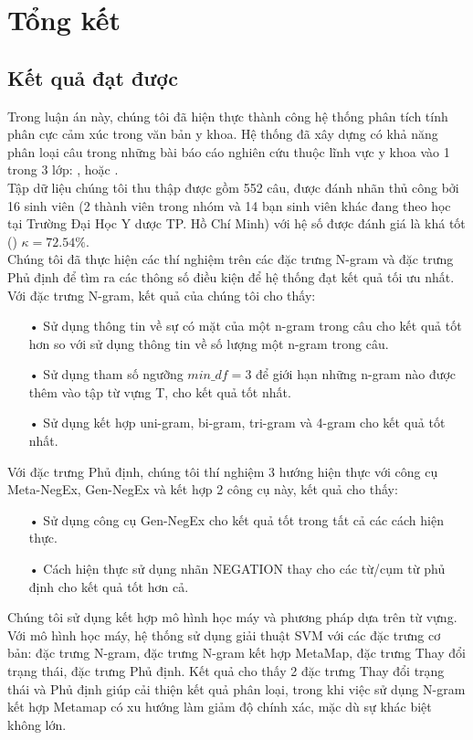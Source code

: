 \section{Tổng kết}
\subsection{Kết quả đạt được}
Trong luận án này, chúng tôi đã hiện thực thành công hệ thống phân tích tính phân cực cảm xúc trong văn bản y khoa. Hệ thống đã xây dựng có khả năng phân loại câu trong những bài báo cáo nghiên cứu thuộc lĩnh vực y khoa vào 1 trong 3 lớp: \tichcuc, \tieucuc hoặc \trungtinh. \\

Tập dữ liệu chúng tôi thu thập được gồm 552 câu, được đánh nhãn thủ công bởi 16 sinh viên (2 thành viên trong nhóm và 14 bạn sinh viên khác đang theo học tại Trường Đại Học Y dược TP. Hồ Chí Minh) với hệ số  được đánh giá là khá tốt () $\kappa=72.54\%$.\\

Chúng tôi đã thực hiện các thí nghiệm trên các đặc trưng N-gram và đặc trưng Phủ định để tìm ra các thông số điều kiện để hệ thống đạt kết quả tối ưu nhất. Với đặc trưng N-gram, kết quả của chúng tôi cho thấy:
\begin{itemize}
\item[•] Sử dụng thông tin về sự có mặt của một n-gram trong câu cho kết quả tốt hơn so với sử dụng thông tin về số lượng một n-gram trong câu.
\item[•] Sử dụng tham số ngưỡng $min\_df=3$ để giới hạn những n-gram nào được thêm vào tập từ vựng T, cho kết quả tốt nhất.
\item[•] Sử dụng kết hợp uni-gram, bi-gram, tri-gram và 4-gram cho kết quả tốt nhất.
\end{itemize}
Với đặc trưng Phủ định, chúng tôi thí nghiệm 3 hướng hiện thực với công cụ Meta-NegEx, Gen-NegEx và kết hợp 2 công cụ này, kết quả cho thấy:
\begin{itemize}
\item[•] Sử dụng công cụ Gen-NegEx cho kết quả tốt trong tất cả các cách hiện thực.
\item[•] Cách hiện thực sử dụng nhãn NEGATION thay cho các từ/cụm từ phủ định cho kết quả tốt hơn cả.
\end{itemize}

Chúng tôi sử dụng kết hợp mô hình học máy và phương pháp dựa trên từ vựng. Với mô hình học máy, hệ thống sử dụng giải thuật SVM với các đặc trưng cơ bản: đặc trưng N-gram, đặc trưng N-gram kết hợp MetaMap, đặc trưng Thay đổi trạng thái, đặc trưng Phủ định. Kết quả cho thấy 2 đặc trưng Thay đổi trạng thái và Phủ định giúp cải thiện kết quả phân loại, trong khi việc sử dụng N-gram kết hợp Metamap có xu hướng làm giảm độ chính xác, mặc dù sự khác biệt không lớn.\\

